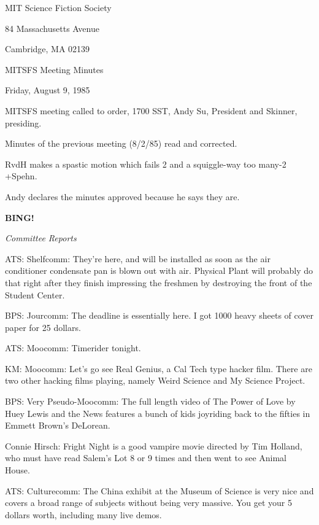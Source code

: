\documentclass[12pt]{article}
\newcommand{\bing}{{\bf BING!} }
\newcommand{\goto}[1]{\bing \vskip 12pt \centerline{{\em{#1}}}}
\begin{document}
\begin{center}

MIT Science Fiction Society 

84 Massachusetts Avenue

Cambridge, MA 02139

\vspace{12pt}

MITSFS Meeting Minutes 

Friday, August 9, 1985

\end{center}
 
\vspace{18pt}

\setlength{\parskip}{6pt}

\noindent
MITSFS meeting called to order, 1700 SST,
Andy Su, President and Skinner, presiding.

Minutes of the previous meeting (8/2/85) read and corrected.

RvdH makes a spastic motion which fails 2 and a squiggle-way too many-2 +Spehn.

Andy declares the minutes approved because he says they are.

\goto{Committee Reports}

ATS: Shelfcomm: They're here, and will be installed as soon as the air conditioner condensate pan is blown out with air. Physical Plant will probably do that right after they finish impressing the freshmen by destroying the front of the Student Center.

BPS: Jourcomm: The deadline is essentially here. I got 1000 heavy sheets of cover paper for 25 dollars.

ATS: Moocomm: Timerider tonight.

KM: Moocomm: Let's go see Real Genius, a Cal Tech type hacker film. There are two other hacking films playing, namely Weird Science and My Science Project.

BPS: Very Pseudo-Moocomm: The full length video of The Power of Love by Huey Lewis and the News features a bunch of kids joyriding back to the fifties in Emmett Brown's DeLorean.

Connie Hirsch: Fright Night is a good vampire movie directed by Tim Holland, who must have read Salem's Lot 8 or 9 times and then went to see Animal House.

ATS: Culturecomm: The China exhibit at the Museum of Science is very nice and covers a broad range of subjects without being very massive. You get your 5 dollars worth, including many live demos.
\end{document}
